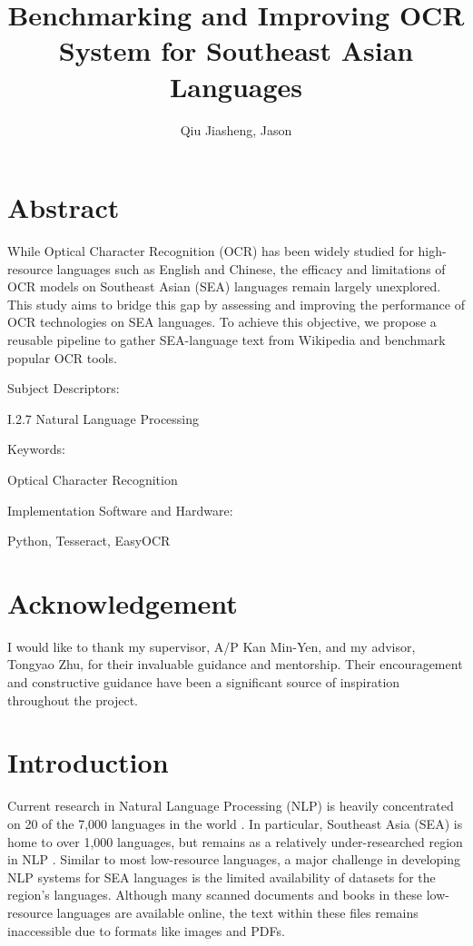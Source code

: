 \documentclass[12pt,oneside]{memoir}
\title{Benchmarking and Improving OCR System for Southeast Asian Languages}
\author{Qiu Jiasheng, Jason}
\begin{document}
\frontmatter

\pagestyle{plain}

\makecover

\setcounter{page}{1}

\maketitle

\chapter{Abstract}
While Optical Character Recognition (OCR) has been widely studied for high-resource languages such as English and Chinese, the efficacy and limitations of OCR models on Southeast Asian (SEA) languages remain largely unexplored.
This study aims to bridge this gap by assessing and improving the performance of OCR technologies on SEA languages.
To achieve this objective, we propose a reusable pipeline to gather SEA-language text from Wikipedia and benchmark popular OCR tools.

\vspace{0.3in}
Subject Descriptors:
\begin{adjustwidth}{0.7in}{}
    I.2.7 Natural Language Processing
\end{adjustwidth}

Keywords:
\begin{adjustwidth}{0.7in}{}
    Optical Character Recognition
\end{adjustwidth}

Implementation Software and Hardware:
\begin{adjustwidth}{0.7in}{}
    Python, Tesseract, EasyOCR
\end{adjustwidth}

\chapter{Acknowledgement}
I would like to thank my supervisor, A/P Kan Min-Yen, and my advisor, Tongyao Zhu, for their invaluable guidance and mentorship. Their encouragement and constructive guidance have been a significant source of inspiration throughout the project.

\listoftables

\tableofcontents

\mainmatter

\chapter{Introduction}
Current research in Natural Language Processing (NLP) is heavily concentrated on 20 of the 7,000 languages in the world \parencite{magueresse-etal-2020}.
In particular, Southeast Asia (SEA) is home to over 1,000 languages, but remains as a relatively under-researched region in NLP \parencite{aji-etal-2023}.
Similar to most low-resource languages, a major challenge in developing NLP systems for SEA languages is the limited availability of datasets for the region’s languages.
Although many scanned documents and books in these low-resource languages are available online, the text within these files remains inaccessible due to formats like images and PDFs.
\end{document}
